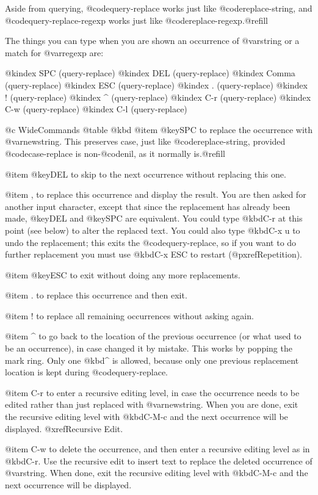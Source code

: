 {{{{{{{{{{{{{{{{{{{  Aside from querying, @code{query-replace} works just like
@code{replace-string}, and @code{query-replace-regexp} works
just like @code{replace-regexp}.@refill

  The things you can type when you are shown an occurrence of @var{string}
or a match for @var{regexp} are:

@kindex SPC (query-replace)
@kindex DEL (query-replace)
@kindex Comma (query-replace)
@kindex ESC (query-replace)
@kindex . (query-replace)
@kindex ! (query-replace)
@kindex ^ (query-replace)
@kindex C-r (query-replace)
@kindex C-w (query-replace)
@kindex C-l (query-replace)

@c WideCommands
@table @kbd
@item @key{SPC}
to replace the occurrence with @var{newstring}.  This preserves case, just
like @code{replace-string}, provided @code{case-replace} is non-@code{nil},
as it normally is.@refill

@item @key{DEL}
to skip to the next occurrence without replacing this one.

@item ,
to replace this occurrence and display the result.  You are then asked
for another input character, except that since the replacement has
already been made, @key{DEL} and @key{SPC} are equivalent.  You could
type @kbd{C-r} at this point (see below) to alter the replaced text.  You
could also type @kbd{C-x u} to undo the replacement; this exits the
@code{query-replace}, so if you want to do further replacement you must use
@kbd{C-x ESC} to restart (@pxref{Repetition}).

@item @key{ESC}
to exit without doing any more replacements.

@item .
to replace this occurrence and then exit.

@item !
to replace all remaining occurrences without asking again.

@item ^
to go back to the location of the previous occurrence (or what used to
be an occurrence), in case changed it by mistake.  This works by
popping the mark ring.  Only one @kbd{^} is allowed, because only one
previous replacement location is kept during @code{query-replace}.

@item C-r
to enter a recursive editing level, in case the occurrence needs to be
edited rather than just replaced with @var{newstring}.  When you are
done, exit the recursive editing level with @kbd{C-M-c} and the next
occurrence will be displayed.  @xref{Recursive Edit}.

@item C-w
to delete the occurrence, and then enter a recursive editing level as
in @kbd{C-r}.  Use the recursive edit to insert text to replace the
deleted occurrence of @var{string}.  When done, exit the recursive
editing level with @kbd{C-M-c} and the next occurrence will be
displayed.

}}}}}}}}}}}}}}}}}}}
